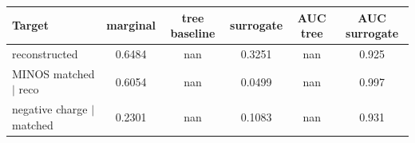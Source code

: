 \begin{tabular}{lccccc}
\toprule
Target & marginal & tree baseline & surrogate & AUC tree & AUC surrogate \\
\midrule
reconstructed & 0.6484 & nan & 0.3251 & nan & 0.925 \\
MINOS matched $\mid$ reco & 0.6054 & nan & 0.0499 & nan & 0.997 \\
negative charge $\mid$ matched & 0.2301 & nan & 0.1083 & nan & 0.931 \\
\bottomrule
\end{tabular}
